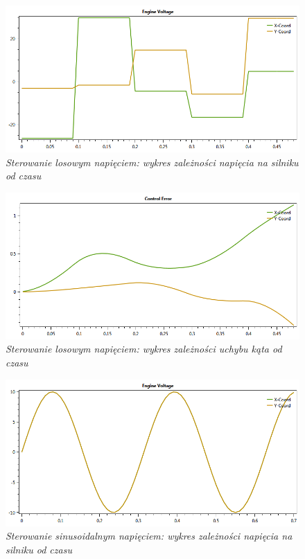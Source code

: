 \documentclass[12pt, twoside, openany]{report}
\theoremstyle{definition}
\begin{document}
\begin{figure}[H]
	\centering
		\includegraphics[width = 350pt]{RandomEV} 
		\caption{\textit{Sterowanie losowym napięciem: wykres zależności napięcia na silniku od czasu}}
		\label{plot:RandomEV}
\end{figure}

\begin{figure}[H]
	\centering
		\includegraphics[width = 350pt]{RandomCE} 
		\caption{\textit{Sterowanie losowym napięciem: wykres zależności uchybu kąta od czasu}}
		\label{plot:RandomCE}
\end{figure}

\begin{figure}[H]
	\centering
		\includegraphics[width = 350pt]{SinusoidalEV} 
		\caption{\textit{Sterowanie sinusoidalnym napięciem: wykres zależności napięcia na silniku od czasu}}
		\label{plot:SinusoidalEV}
\end{figure}
\end{document}
